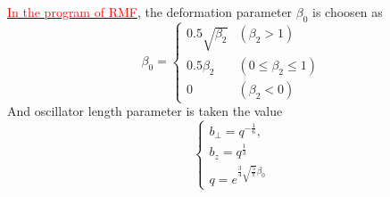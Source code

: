   \underline{\textcolor{red}{In the program of RMF}}, the deformation parameter $\beta_0$ is choosen as
  \begin{equation}
    \beta_{0}= 
    \begin{cases}
      0.5 \sqrt{\beta_{2}} & \left(\beta_{2}>1\right) \\ 
      0.5 \beta_{2}        & \left(0 \leq \beta_{2} \leq 1\right) \\ 
      0                    & \left(\beta_{2}<0\right)
    \end{cases}
  \end{equation}
  And oscillator length parameter is taken the value
  \begin{equation}
    \begin{cases}
      b_{\perp} = q^{-\frac{1}{6}}, \\
      b_z = q^{\frac{1}{3}}  \\
      q  = e^{\frac{3}{4}\sqrt{\frac{5}{\pi}} \beta_0}
    \end{cases}
  \end{equation}


